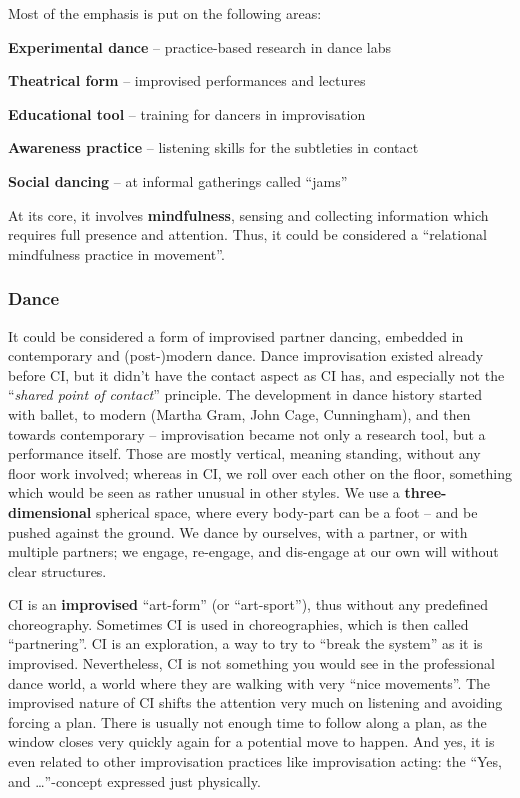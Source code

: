 Most of the emphasis is put on the following areas:

\begin{itemize*}
    \item [] \textbf{Experimental dance} -- practice-based research in dance labs
    \item [] \textbf{Theatrical form} -- improvised performances and lectures
    \item [] \textbf{Educational tool} -- training for dancers in improvisation
    \item [] \textbf{Awareness practice} -- listening skills for the subtleties in contact
    \item [] \textbf{Social dancing} -- at informal gatherings called ``jams''
\end{itemize*}

At its core, it involves \textbf{mindfulness}, sensing and collecting information which requires full presence and attention.
Thus, it could be considered a ``relational mindfulness practice in movement''.

\subsubsection{Dance}\label{subsec:dance}

It could be considered a form of improvised partner dancing, embedded in contemporary and (post-)modern dance.
Dance improvisation existed already before CI, but it didn't have the contact aspect as CI has, and especially not the ``\textit{shared point of contact}'' principle.
The development in dance history started with ballet, to modern (Martha Gram, John Cage, Cunningham), and then towards contemporary -- improvisation became not only a research tool, but a performance itself.
Those are mostly vertical, meaning standing, without any floor work involved; whereas in CI, we roll over each other on the floor, something which would be seen as rather unusual in other styles.
We use a \textbf{three-dimensional} spherical space, where every body-part can be a foot -- and be pushed against the ground.
We dance by ourselves, with a partner, or with multiple partners; we engage, re-engage, and dis-engage at our own will without clear structures.

CI is an \textbf{improvised} ``art-form'' (or ``art-sport''), thus without any predefined choreography.
Sometimes CI is used in choreographies, which is then called ``partnering''.
CI is an exploration, a way to try to ``break the system'' as it is improvised.
Nevertheless, CI is not something you would see in the professional dance world, a world where they are walking with very ``nice movements''.
The improvised nature of CI shifts the attention very much on listening and avoiding forcing a plan.
There is usually not enough time to follow along a plan, as the window closes very quickly again for a potential move to happen.
And yes, it is even related to other improvisation practices like improvisation acting: the ``Yes, and \ldots''-concept expressed just physically.

